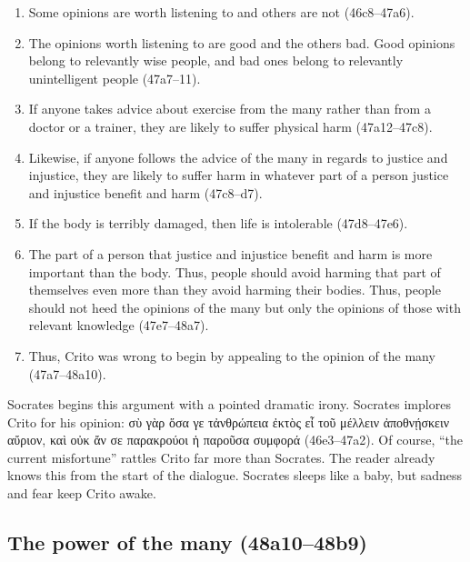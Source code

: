 \documentclass[12pt,letterpaper]{article}
\begin{document}
\begin{enumerate}

    \item Some opinions are worth listening to and others are not (46c8--47a6).

    \item The opinions worth listening to are good and the others bad. Good opinions belong to relevantly wise people, and bad ones belong to relevantly unintelligent people (47a7--11).

    \item If anyone takes advice about exercise from the many rather than from a doctor or a trainer, they are likely to suffer physical harm (47a12--47c8).

    \item Likewise, if anyone follows the advice of the many in regards to justice and injustice, they are likely to suffer harm in whatever part of a person justice and injustice benefit and harm (47c8--d7).

    \item If the body is terribly damaged, then life is intolerable (47d8--47e6).

    \item The part of a person that justice and injustice benefit and harm is more important than the body. Thus, people should avoid harming that part of themselves even more than they avoid harming their bodies. Thus, people should not heed the opinions of the many but only the opinions of those with relevant knowledge (47e7--48a7).

    \item Thus, Crito was wrong to begin by appealing to the opinion of the many (47a7--48a10).

\end{enumerate}

Socrates begins this argument with a pointed dramatic irony. Socrates implores Crito for his opinion: \textgreek{σὺ γὰρ ὅσα γε τἀνθρώπεια ἐκτὸς εἶ τοῦ μέλλειν ἀποθνῄσκειν αὔριον, καὶ οὐκ ἄν σε παρακρούοι ἡ παροῦσα συμφορά} (46e3--47a2). Of course, ``the current misfortune'' rattles Crito far more than Socrates. The reader already knows this from the start of the dialogue. Socrates sleeps like a baby, but sadness and fear keep Crito awake.

\subsection*{The power of the many (48a10--48b9)}
\end{document}
